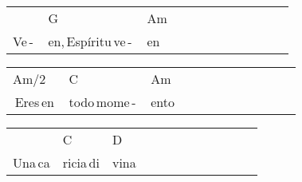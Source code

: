\begin{multicols}{2}
\begin{minipage}{\columnwidth}
\noindent
\begin{tabular}{llllllllllll}
&G&Am\\
Ve\,-\,&en,\,Espíritu\,ve\,-\,&en
\end{tabular}

\noindent
\begin{tabular}{llllllllllll}
Am{/}2&C&Am\\
\,Eres\,en\,&todo\,mome\,-\,&ento
\end{tabular}

\noindent
\begin{tabular}{llllllllllll}
&C&D\\
Una\,ca&ricia\,di&vina
\end{tabular}
\end{minipage}\\

\end{multicols}